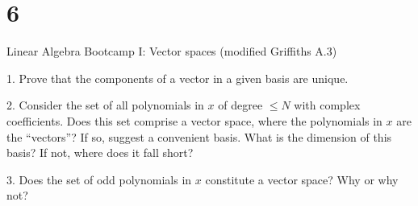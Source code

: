 \documentclass{article}
\begin{document}
\section*{6}
\begin{ques}
Linear Algebra Bootcamp I: Vector spaces (modified Griffiths A.3)

1. Prove that the components of a vector in a given basis are unique.

2. Consider the set of all polynomials in $x$ of degree $\le N$ with complex coefficients. Does this set comprise a vector space, where the polynomials in $x$ are the ``vectors''? If so, suggest a convenient basis. What is the dimension of this basis? If not, where does it fall short?

3. Does the set of odd polynomials in $x$ constitute a vector space? Why or why not?
\end{ques}
\end{document}
